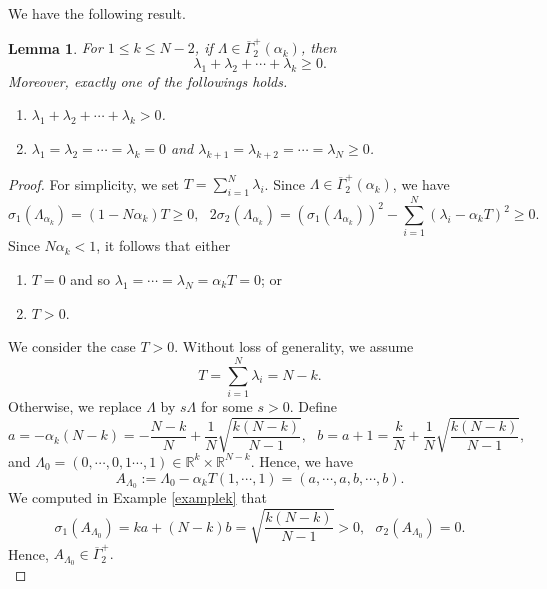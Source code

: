 \documentclass[12pt]{amsart}
\theoremstyle{plain}
\newtheorem{lemma}[thm]{Lemma}
\theoremstyle{definition}
\renewcommand{\bar}{\overline}
\newcommand{\beq}{\begin{equation}}
\newcommand{\eeq}{\end{equation}}
\newcommand{\bd}{\begin{enumerate}}
\newcommand{\ed}{\end{enumerate}}
\renewcommand{\>}{\rightarrow}
\numberwithin{equation}{section} %
\begin{document}
	

	
	We have the following result.
	\begin{lemma}\label{lem1} For $1\leq k\leq N-2$,	
		if $\Lambda\in\bar{\Gamma}_2^+(\alpha_k)$, then
		\beq \label{4.000}
		\lambda_{1}+\lambda_{2}+\cdots+\lambda_k\geq0.
		\eeq 
	\noindent Moreover, exactly one of the followings holds.
		\bd \item   $\lambda_{1}+\lambda_{2}+\cdots+\lambda_k>0$.
			\item	$\lambda_{1}=\lambda_{2}=\cdots=\lambda_k=0$ and $\lambda_{k+1}=\lambda_{k+2}=\cdots=\lambda_{N}\geq0$.
		\ed
	\end{lemma}
	
	\begin{proof} For simplicity, we set $T=\sum\limits_{i=1}^N \lambda_i$. Since $\Lambda\in\bar{\Gamma}_2^+(\alpha_k)$, we have
		$$\sigma_1(\Lambda_{\alpha_k})=(1-N\alpha_k)T\geq 0,\ \ \  2\sigma_2(\Lambda_{\alpha_k})=\left(\sigma_1(\Lambda_{\alpha_k})\right)^2-\sum_{i=1}^N\left(\lambda_i-\alpha_kT\right)^2\geq 0.$$
		Since $N\alpha_k<1$, it follows that either  \bd  \item $T=0$ and so $\lambda_1=\cdots =\lambda_N=\alpha_kT=0$; or 
			\item $T>0$.
		\ed
		We  consider the case  $T>0$.  Without loss of generality, we assume  
		\begin{equation}\label{eq8}
		T=\sum_{i=1}^N\lambda_i=N-k.
		\end{equation}
		Otherwise, we replace $\Lambda$ by $s\Lambda$ for some $s>0$.
		Define 
		$$a=-\alpha_k(N-k)=-\frac{N-k}{N}+\frac{1}{N}\sqrt{\frac{k(N-k)}{N-1}},\ \ \ b=a+1=\frac{k}{N}+\frac{1}{N}\sqrt{\frac{k(N-k)}{N-1}},$$
		and $ \Lambda_0=(0,\cdots,0, 1\cdots,1)\in\mathbb{R}^{k}\times\mathbb{R}^{N-k}$. Hence, we have  $$A_{\Lambda_0}:=\Lambda_0-\alpha_k T(1,\cdots, 1)=(a,\cdots,a,b,\cdots,b).$$ We computed in Example \ref{examplek} that 
		$$
			\sigma_1(A_{\Lambda_0})=ka+(N-k)b=\sqrt{\frac{k(N-k)}{N-1}}>0,\ \ \ \sigma_2(A_{\Lambda_0})=0. $$ Hence, $A_{\Lambda_0}\in\bar{\Gamma}_2^+.$\\
		

\end{proof}
\end{document}
